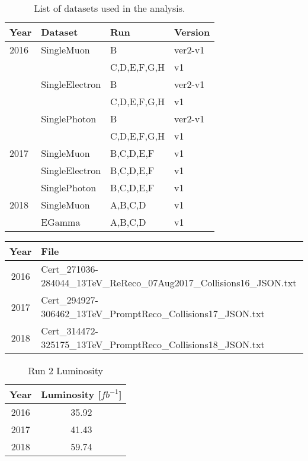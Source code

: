 \begin{table}[h]
\centering
\caption{List of datasets used in the analysis.}
\begin{tabular}{|l|l|l|l|}
\hline
Year & Dataset & Run & Version \\ \hline
2016 & SingleMuon     & B           & ver2-v1 \\
     &                & C,D,E,F,G,H & v1      \\
     & SingleElectron & B           & ver2-v1 \\
     &                & C,D,E,F,G,H & v1      \\
     & SinglePhoton   & B           & ver2-v1 \\
     &                & C,D,E,F,G,H & v1      \\ \hline
2017 & SingleMuon     & B,C,D,E,F & v1 \\
     & SingleElectron & B,C,D,E,F & v1 \\
     & SinglePhoton   & B,C,D,E,F & v1 \\\hline
2018 & SingleMuon & A,B,C,D & v1 \\
     & EGamma     & A,B,C,D & v1 \\ \hline
\end{tabular}
\label{tab:Datasets}
\end{table}


\begin{table}[htbp]
  \footnotesize
  \centering
  \label{tab:gJSON}
  \begin{tabular}{ c l }
    \hline
    Year & File \\
    \hline
    2016 & Cert\_271036-284044\_13TeV\_ReReco\_07Aug2017\_Collisions16\_JSON.txt \\
    2017 & Cert\_294927-306462\_13TeV\_PromptReco\_Collisions17\_JSON.txt \\
    2018 & Cert\_314472-325175\_13TeV\_PromptReco\_Collisions18\_JSON.txt \\
    \hline
  \end{tabular}
  \label{tab:GoldenJson}
\end{table}

\begin{table}
  \caption{Run 2 Luminosity}
 \begin{center}
 \begin{tabular}{cc}\hline\hline
 Year & Luminosity [$fb^{-1}$] \\ \hline\hline
 2016 & 35.92  \\
 2017 & 41.43 \\
 2018 & 59.74 \\
 \end{tabular}
 \end{center}
 \label{tab:LuminosityPerYear}
\end{table}
